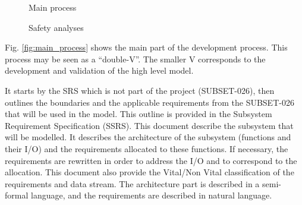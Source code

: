 \documentclass{template/openetcs_article}
\begin{document}
\begin{figure}
  \centering
  \caption{Main process}
  \label{fig:main_process}
  \centering
  \caption{Safety analyses}
  \label{fig:safety_process}
 \end{figure}

Fig. \ref{fig:main_process} shows the main part of the development process. This process may be seen
as a ``double-V''. The smaller V corresponds to the development and validation of the high level model. 

It starts by the SRS which is not part of the project (SUBSET-026), then outlines the boundaries and 
the applicable requirements from the SUBSET-026 that will be used in the model. This outline 
is provided in the Subsystem Requirement Specification (SSRS). This document describe the subsystem that 
will be modelled. It describes the architecture of the subsystem (functions and their I/O) and the 
requirements allocated to these functions. If necessary, the requirements are rewritten in order to 
address the I/O and to correspond to the allocation. This document also provide the Vital/Non Vital 
classification of the requirements and data stream. The architecture part is described in a 
semi-formal language, and the requirements are described in natural language.
\end{document}
